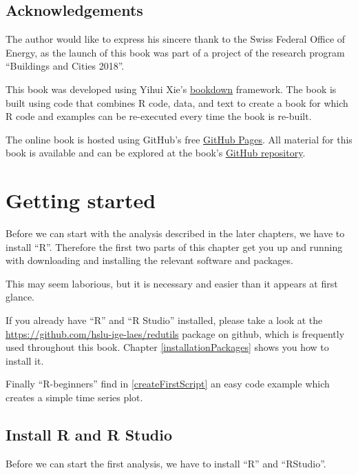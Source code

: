 \documentclass[
]{book}
\begin{document}
\hypertarget{acknowledgements}{%
\section{Acknowledgements}\label{acknowledgements}}

The author would like to express his sincere thank to the Swiss Federal Office of Energy, as the launch of this book was part of a project of the research program ``Buildings and Cities 2018''.

This book was developed using Yihui Xie's \href{https://bookdown.org}{bookdown} framework. The book is built using code that combines R code, data, and text to create a book for which R code and examples can be re-executed every time the book is re-built.

The online book is hosted using GitHub's free \href{https://pages.github.com}{GitHub Pages}. All material for this book is available and can be explored at the book's \href{https://github.com/hslu-ige-laes/edar}{GitHub repository}.

\hypertarget{getting-started}{%
\chapter{Getting started}\label{getting-started}}

Before we can start with the analysis described in the later chapters, we have to install ``R''.
Therefore the first two parts of this chapter get you up and running with downloading and installing the relevant software and packages.

This may seem laborious, but it is necessary and easier than it appears at first glance.

If you already have ``R'' and ``R Studio'' installed, please take a look at the \url{https://github.com/hslu-ige-laes/redutils} package on github, which is frequently used throughout this book. Chapter \ref{installationPackages} shows you how to install it.

Finally ``R-beginners'' find in \ref{createFirstScript} an easy code example which creates a simple time series plot.

\hypertarget{installation}{%
\section{Install R and R Studio}\label{installation}}

Before we can start the first analysis, we have to install ``R'' and ``RStudio''.
\end{document}
